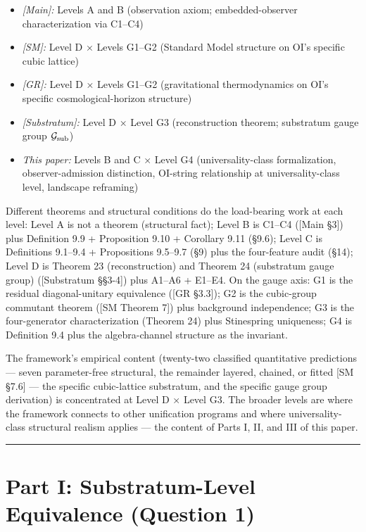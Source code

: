 \documentclass[
]{article}
\providecommand{\tightlist}{%
  \setlength{\itemsep}{0pt}\setlength{\parskip}{0pt}}
\begin{document}
\begin{itemize}
\tightlist
\item
  \emph{{[}Main{]}:} Levels A and B (observation axiom;
  embedded-observer characterization via C1--C4)
\item
  \emph{{[}SM{]}:} Level D × Levels G1--G2 (Standard Model structure on
  OI's specific cubic lattice)
\item
  \emph{{[}GR{]}:} Level D × Levels G1--G2 (gravitational thermodynamics
  on OI's specific cosmological-horizon structure)
\item
  \emph{{[}Substratum{]}:} Level D × Level G3 (reconstruction theorem;
  substratum gauge group \(\mathcal{G}_{\rm sub}\))
\item
  \emph{This paper:} Levels B and C × Level G4 (universality-class
  formalization, observer-admission distinction, OI-string relationship
  at universality-class level, landscape reframing)
\end{itemize}

Different theorems and structural conditions do the load-bearing work at
each level: Level A is not a theorem (structural fact); Level B is
C1--C4 ({[}Main §3{]}) plus Definition 9.9 + Proposition 9.10 +
Corollary 9.11 (§9.6); Level C is Definitions 9.1--9.4 + Propositions
9.5--9.7 (§9) plus the four-feature audit (§14); Level D is Theorem 23
(reconstruction) and Theorem 24 (substratum gauge group) ({[}Substratum
§§3-4{]}) plus A1--A6 + E1--E4. On the gauge axis: G1 is the residual
diagonal-unitary equivalence ({[}GR §3.3{]}); G2 is the cubic-group
commutant theorem ({[}SM Theorem 7{]}) plus background independence; G3
is the four-generator characterization (Theorem 24) plus Stinespring
uniqueness; G4 is Definition 9.4 plus the algebra-channel structure as
the invariant.

The framework's empirical content (twenty-two classified quantitative
predictions --- seven parameter-free structural, the remainder layered,
chained, or fitted {[}SM §7.6{]} --- the specific cubic-lattice
substratum, and the specific gauge group derivation) is concentrated at
Level D × Level G3. The broader levels are where the framework connects
to other unification programs and where universality-class structural
realism applies --- the content of Parts I, II, and III of this paper.

\begin{center}\rule{0.5\linewidth}{0.5pt}\end{center}

\hypertarget{part-i-substratum-level-equivalence-question-1}{%
\section{Part I: Substratum-Level Equivalence (Question
1)}\label{part-i-substratum-level-equivalence-question-1}}
\end{document}
